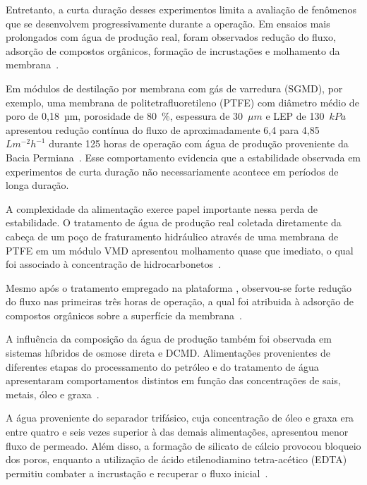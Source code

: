Entretanto, a curta duração desses experimentos limita a avaliação de fenômenos que se desenvolvem progressivamente durante a operação. Em ensaios mais prolongados com água de produção real, foram observados redução do fluxo, adsorção de compostos orgânicos, formação de incrustações e molhamento da membrana~\cite{Thakur2020SGMD, Hsieh2021Pretreatments, Nawaz2021FO_MD, Pawar2022AGMD}.

Em módulos de destilação por membrana com gás de varredura (SGMD), por exemplo, uma membrana de politetrafluoretileno (PTFE) com diâmetro
médio de poro de 0,18~µm, porosidade de 80~\%, espessura de 30~$\mu m$ e LEP de 130~$kPa$ apresentou redução contínua do fluxo de aproximadamente 6,4 para 4,85~$Lm^{-2}h^{-1}$ durante 125 horas de operação com água de produção proveniente da Bacia Permiana~\cite{Thakur2020SGMD}. Esse comportamento evidencia que a estabilidade observada em experimentos de curta duração não necessariamente acontece em períodos de longa duração.

A complexidade da alimentação exerce papel importante nessa perda de estabilidade. O tratamento de água de produção real coletada diretamente da cabeça de um poço de fraturamento hidráulico através de uma membrana de PTFE em um módulo VMD apresentou molhamento quase que imediato, o qual foi associado à concentração de hidrocarbonetos~\cite{Hsieh2021Pretreatments}.

Mesmo após o tratamento empregado na plataforma , observou-se forte redução do fluxo nas primeiras três horas de operação, a qual foi atribuida à adsorção de compostos orgânicos sobre a superfície da membrana~\cite{Hsieh2021Pretreatments}.

A influência da composição da água de produção também foi observada em sistemas híbridos de osmose direta e DCMD. Alimentações provenientes de diferentes etapas do processamento do petróleo e do tratamento de água apresentaram comportamentos distintos em função das concentrações de sais, metais, óleo e graxa~\cite{Nawaz2021FO_MD}.

A água proveniente do separador trifásico, cuja concentração de óleo e graxa era entre quatro e seis vezes superior à das demais alimentações, apresentou menor fluxo de permeado. Além disso, a formação de silicato de cálcio provocou bloqueio dos poros, enquanto a utilização de ácido etilenodiamino tetra-acético (EDTA) permitiu combater a incrustação e recuperar o fluxo inicial~\cite{Nawaz2021FO_MD}.


